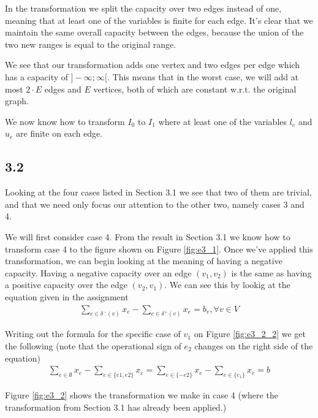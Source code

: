 \documentclass[12pt]{article}
\begin{document}
In the transformation we split the capacity over two edges instead of one, meaning that at least one of the variables is finite for each edge. It's clear that we maintain the same overall capacity between the edges, because the union of the two new ranges is equal to the original range.

We see that our transformation adds one vertex and two edges per edge which has a capacity of $]-\infty;\infty[$. This means that in the worst case, we will add at most $2\cdot E$ edges and $E$ vertices, both of which are constant w.r.t. the original graph.

We now know how to transform $I_0$ to $I_1$ where at least one of the variables $l_e$ and $u_e$ are finite on each edge.

\subsection{3.2}
Looking at the four cases listed in Section 3.1 we see that two of them are trivial, and that we need only focus our attention to the other two, namely cases 3 and 4.

We will first consider case 4. From the result in Section 3.1 we know how to transform case 4 to the figure shown on Figure \ref{fig:e3_1}. Once we've applied this transformation, we can begin looking at the meaning of having a negative capacity. Having a negative capacity over an edge $(v_1, v_2)$ is the same as having a positive capacity over the edge $(v_2, v_1)$. We can see this by lookig at the equation given in the assignment
\begin{align*}
    \sum_{e\in \delta^-(v)}{x_e}-\sum_{e\in \delta^+(v)}{x_e} = b_v, \forall{v} \in V
\end{align*}

Writing out the formula for the specific case of $v_1$ on Figure \ref{fig:e3_2_2} we get the following (note that the operational sign of $e_2$ changes on the right side of the equation)
\begin{align*}
    \sum_{e\in \emptyset}{x_e} - \sum_{e\in \{e1, e2\}}{x_e} =
    \sum_{e\in \{-e2\}}{x_e} - \sum_{e\in \{e_1\}}{x_e} = b
\end{align*}

Figure \ref{fig:e3_2} shows the transformation we make in case 4 (where the transformation from Section 3.1 has already been applied.)
\end{document}

